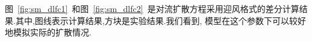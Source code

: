 \begin{figure}[h]
\centering
 \begin{floatrow}
 \end{floatrow}
\end{figure}
图~\ref{fig:sm_dlfc1}~和图~\ref{fig:sm_dlfc2}~是对流扩散方程采用迎风格式的差分计算结果.其中,图线表示计算结果,方块是实验结果.我们看到,
模型在这个参数下可以较好地模拟实际的扩散情况.
